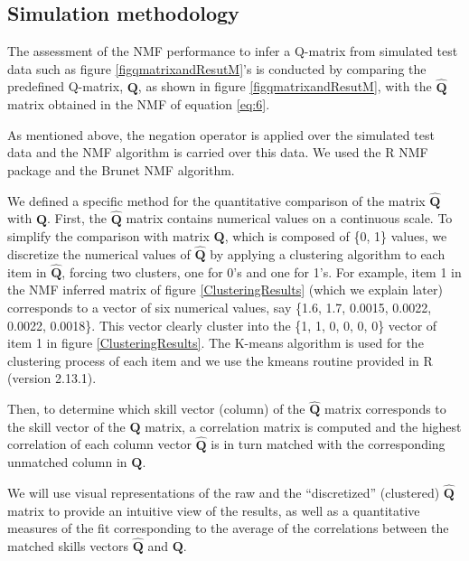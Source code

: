 


\subsection{Simulation methodology}


The assessment of the NMF performance to infer a Q-matrix from simulated test data such as figure \ref{figqmatrixandResutM}'s is conducted by comparing the predefined Q-matrix, $\mathbf{Q}$, as shown in figure \ref{figqmatrixandResutM}, with the $\hat{\mathbf{Q}}$ matrix obtained in the NMF of equation \ref{eq:6}.

As mentioned above, the negation operator is applied over the simulated test data and the NMF algorithm is carried over this data. We used the R NMF package \citep{Gaujoux2010} and the Brunet NMF algorithm.

We defined a specific method for the quantitative comparison of the matrix $\hat{\mathbf{Q}}$ with $\mathbf{Q}$. First, the $\hat{\mathbf{Q}}$ matrix contains numerical values on a continuous scale. To simplify the comparison with matrix $\mathbf{Q}$, which is composed of \{0, 1\} values, we discretize the numerical values of $\hat{\mathbf{Q}}$ by applying a clustering algorithm to each item in $\hat{\mathbf{Q}}$, forcing two clusters, one for 0\textquoteright{}s and one for 1\textquoteright{}s. For example, item 1 in the NMF inferred matrix of figure \ref{ClusteringResults}  (which we explain later) corresponds to a vector of six numerical values, say \{1.6, 1.7, 0.0015, 0.0022, 0.0022, 0.0018\}. This vector clearly cluster into the \{1, 1, 0, 0, 0, 0\} vector of item 1 in figure \ref{ClusteringResults}. The K-means algorithm is used for the clustering process of each item and we use the kmeans routine provided in R (version 2.13.1).

Then, to determine which skill vector (column) of the $\hat{\mathbf{Q}}$ matrix corresponds to the skill vector of the $\mathbf{Q}$ matrix, a correlation matrix is computed and the highest correlation of each column vector $\hat{\mathbf{Q}}$ is in turn matched with the corresponding unmatched column in $\mathbf{Q}$.

We will use visual representations of the raw and the \textquotedblleft{}discretized\textquotedblright{} (clustered) $\hat{\mathbf{Q}}$ matrix to provide an intuitive view of the results, as well as a quantitative measures of the fit corresponding to the average of the correlations between the matched skills vectors $\hat{\mathbf{Q}}$ and $\mathbf{Q}$.


